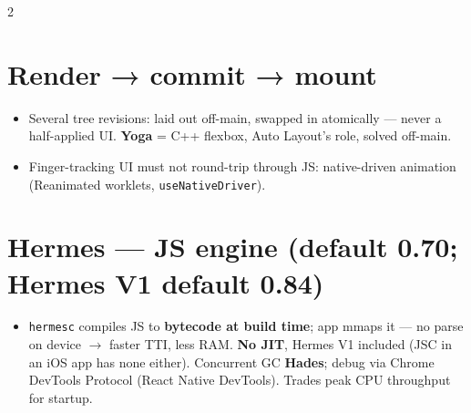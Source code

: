 \documentclass[8pt]{extarticle}
\begin{document}
\begin{multicols}{2}
\section{Render → commit → mount}
\begin{itemize}
  \item Several tree revisions: laid out off-main, swapped in atomically — never a
        half-applied UI. \textbf{Yoga} = C++ flexbox, Auto Layout's role, solved off-main.
  \item Finger-tracking UI must not round-trip through JS: native-driven animation
        (Reanimated worklets, \texttt{useNativeDriver}).
\end{itemize}

\section{Hermes — JS engine (default 0.70; Hermes V1 default 0.84)}
\begin{itemize}
  \item \texttt{hermesc} compiles JS to \textbf{bytecode at build time}; app mmaps it —
        no parse on device $\to$ faster TTI, less RAM. \textbf{No JIT}, Hermes V1 included
        (JSC in an iOS app has none either). Concurrent GC \textbf{Hades}; debug via Chrome DevTools
        Protocol (React Native DevTools). Trades peak CPU throughput for startup.
\end{itemize}


\end{multicols}
\end{document}
